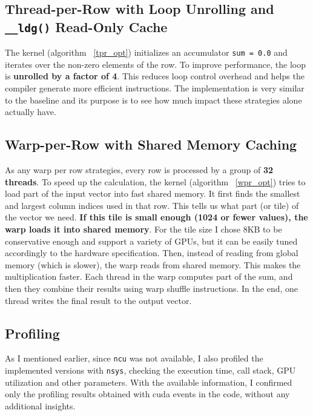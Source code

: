 \documentclass[conference]{IEEEtran}
\begin{document}
\subsection{Thread-per-Row with Loop Unrolling and \texttt{\_\_ldg()} Read-Only Cache}

The kernel (algorithm ~\ref{tpr_opt}) initializes an accumulator \texttt{sum = 0.0} and iterates over the non-zero elements of the row. To improve performance, the loop is \textbf{unrolled by a factor of 4}. This reduces loop control overhead and helps the compiler generate more efficient instructions. The implementation is very similar to the baseline and its purpose is to see how much impact these strategies alone actually have.

\subsection{Warp-per-Row with Shared Memory Caching}

As any warp per row strategies, every row is processed by a group of \textbf{32 threads}. To speed up the calculation, the kernel (algorithm ~\ref{wpr_opt}) tries to load part of the input vector into fast shared memory. It first finds the smallest and largest column indices used in that row. This tells us what part (or tile) of the vector we need. \textbf{If this tile is small enough (1024 or fewer values), the warp loads it into shared memory}. For the tile size I chose 8KB to be conservative enough and support a variety of GPUs, but it can be easily tuned accordingly to the hardware specification. Then, instead of reading from global memory (which is slower), the warp reads from shared memory. This makes the multiplication faster. Each thread in the warp computes part of the sum, and then they combine their results using warp shuffle instructions. In the end, one thread writes the final result to the output vector.

\subsection{Profiling}

As I mentioned earlier, since \texttt{ncu} was not available, I also profiled the implemented versions with \texttt{nsys}, checking the execution time, call stack, GPU utilization and other parameters. With the available information, I confirmed only the profiling results obtained with cuda events in the code, without any additional insights.
\end{document}
